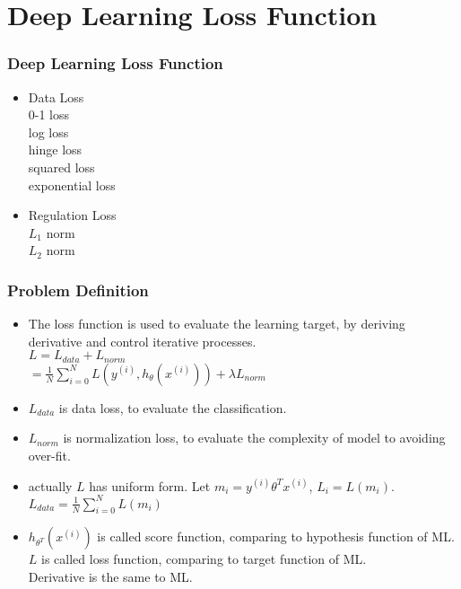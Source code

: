 
\ifx\allfiles\undefined

\fi
\section{Deep Learning Loss Function}
\begin{frame}
\frametitle{Deep Learning Loss Function}
	\small
	\begin{itemize}
		\item Data Loss\\
			\hspace{1cm}0-1 loss\\
			\hspace{1cm}log loss\\
			\hspace{1cm}hinge loss\\
			\hspace{1cm}squared loss\\
			\hspace{1cm}exponential loss
		\item Regulation Loss\\
			\hspace{1cm}$L_1$ norm\\
			\hspace{1cm}$L_2$ norm
	\end{itemize}
\end{frame}
\begin{frame}
\frametitle{Problem Definition}
	\small
	\begin{itemize}
		\item The loss function is used to evaluate the learning target, by deriving derivative and control iterative processes. \\
			\hspace{1cm}$L=L_{data}+L_{norm}$\\
			\hspace{1.5cm}$=\frac{1}{N}\sum_{i=0}^N L(y^{(i)},h_{\theta}(x^{(i)})) 
						+ \lambda L_{norm}$
		\item $L_{data}$ is data loss, to evaluate the classification.
		\item $L_{norm}$ is normalization loss, to evaluate the complexity of model to avoiding over-fit.
		\item actually $L$ has uniform form. Let $m_i=y^{(i)}\theta^Tx^{(i)}$, $L_i=L(m_i)$.\\
			\hspace{1cm}$L_{data}=\frac{1}{N}\sum_{i=0}^N L(m_i)$
		\item $h_{\theta^T}(x^{(i)})$ is called score function, comparing to hypothesis function of ML.\\
			\hspace{1cm} $L$ is called loss function, comparing to target function of ML.\\
			\hspace{1cm} Derivative is the same to ML.
	\end{itemize}
\end{frame}
